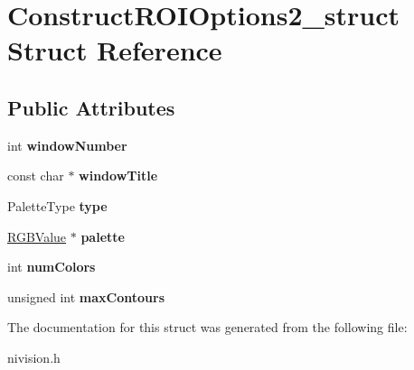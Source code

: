\hypertarget{structConstructROIOptions2__struct}{\section{\-Construct\-R\-O\-I\-Options2\-\_\-struct \-Struct \-Reference}
\label{structConstructROIOptions2__struct}
}
\subsection*{\-Public \-Attributes}
\begin{DoxyCompactItemize}
\item 
\hypertarget{structConstructROIOptions2__struct_ae7d105748ce09c852b2f795819a5b2c4}{int {\bfseries window\-Number}}\label{structConstructROIOptions2__struct_ae7d105748ce09c852b2f795819a5b2c4}

\item 
\hypertarget{structConstructROIOptions2__struct_aee9c7095532d220af8a9c57867ea6f09}{const char $\ast$ {\bfseries window\-Title}}\label{structConstructROIOptions2__struct_aee9c7095532d220af8a9c57867ea6f09}

\item 
\hypertarget{structConstructROIOptions2__struct_a1bb83c019e90d6f09ed4ab71e411d099}{\-Palette\-Type {\bfseries type}}\label{structConstructROIOptions2__struct_a1bb83c019e90d6f09ed4ab71e411d099}

\item 
\hypertarget{structConstructROIOptions2__struct_a62b94cc293de4bb419329f04973fd398}{\hyperlink{structRGBValue__struct}{\-R\-G\-B\-Value} $\ast$ {\bfseries palette}}\label{structConstructROIOptions2__struct_a62b94cc293de4bb419329f04973fd398}

\item 
\hypertarget{structConstructROIOptions2__struct_a3eec167ec42dbaec506fde40db6129a7}{int {\bfseries num\-Colors}}\label{structConstructROIOptions2__struct_a3eec167ec42dbaec506fde40db6129a7}

\item 
\hypertarget{structConstructROIOptions2__struct_a7269dc54416d03a77189518976963d85}{unsigned int {\bfseries max\-Contours}}\label{structConstructROIOptions2__struct_a7269dc54416d03a77189518976963d85}

\end{DoxyCompactItemize}


\-The documentation for this struct was generated from the following file\-:\begin{DoxyCompactItemize}
\item 
nivision.\-h\end{DoxyCompactItemize}
